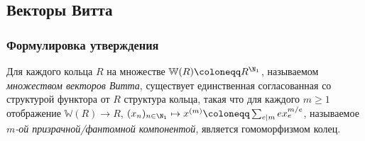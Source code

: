 \documentclass[
	extrafontsizes,
	11pt,
	hyphens,
]{memoir}
\begin{document}
\subsection{Векторы Витта}

\subsubsection{Формулировка утверждения}

%
%

\begin{statement}%
Для каждого кольца \(R\) на множестве \(\mathbb{W}(R) \coloneqq R^{\N_1}\), называемом \emph{множеством векторов Витта}, существует единственная согласованная со структурой функтора от \(R\) структура кольца, такая что
для каждого \(m \geq 1\)
отображение
\(
\mathbb{W}(R) \to R
\),
\(
(x_n)_{n \in \N_1} \mapsto x^{(m)}
\coloneqq \sum_{e \mid m} e x_e^{m/e}
\),
называемое \emph{\(m\)-ой призрачной/фантомной компонентой},
является гомоморфизмом колец.
\label{st:witt1}
\end{statement}
\end{document}
